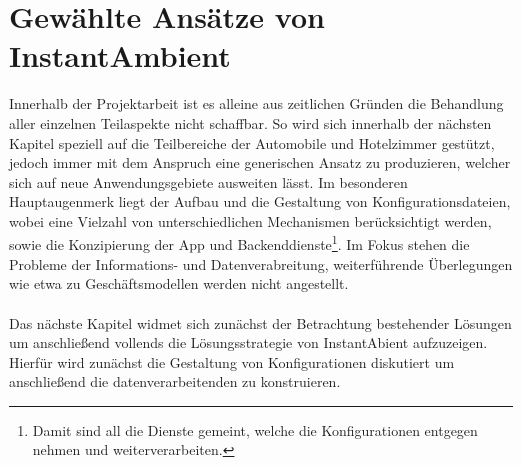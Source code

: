 \section{Gewählte Ansätze von InstantAmbient}
Innerhalb der Projektarbeit ist es alleine aus zeitlichen Gründen die Behandlung aller einzelnen Teilaspekte nicht schaffbar. So wird sich innerhalb der nächsten Kapitel 
speziell auf die Teilbereiche der Automobile und Hotelzimmer gestützt, jedoch immer mit dem Anspruch eine generischen Ansatz zu produzieren, welcher sich auf neue 
Anwendungsgebiete ausweiten lässt. Im besonderen Hauptaugenmerk liegt der Aufbau und die Gestaltung von Konfigurationsdateien, wobei eine Vielzahl von unterschiedlichen 
Mechanismen berücksichtigt werden, sowie die Konzipierung der App und Backenddienste\footnote{Damit sind all die Dienste gemeint, welche die Konfigurationen entgegen nehmen 
und weiterverarbeiten.}. Im Fokus stehen die Probleme der Informations- und Datenverabreitung, weiterführende Überlegungen wie etwa zu Geschäftsmodellen werden nicht 
angestellt. 
\\\\
Das nächste Kapitel widmet sich zunächst der Betrachtung bestehender Lösungen um anschließend vollends die Lösungsstrategie von InstantAbient aufzuzeigen. Hierfür wird 
zunächst die Gestaltung von Konfigurationen diskutiert um anschließend die datenverarbeitenden zu konstruieren. 

